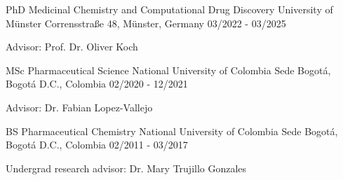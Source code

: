 

\begin{cventries}

  \cventry
    {PhD Medicinal Chemistry and Computational Drug Discovery} %
    {University of Münster} %
    {Corrensstraße 48, Münster, Germany} %
    {03/2022 - 03/2025} %
    {
      \begin{cvitems} %
        \item {Advisor: Prof. Dr. Oliver Koch}
      \end{cvitems}
    }

  \cventry
    {MSc Pharmaceutical Science} %
    {National University of Colombia} %
    {Sede Bogotá, Bogotá D.C., Colombia} %
    {02/2020 - 12/2021} %
    {
      \begin{cvitems} %
        \item {Advisor: Dr. Fabian Lopez-Vallejo}
      \end{cvitems}
    }

  \cventry
    {BS Pharmaceutical Chemistry} %
    {National University of Colombia} %
    {Sede Bogotá, Bogotá D.C., Colombia} %
    {02/2011 - 03/2017} %
    {
      \begin{cvitems} %
        \item {Undergrad research advisor: Dr. Mary Trujillo Gonzales}
      \end{cvitems}
    }

\end{cventries}
